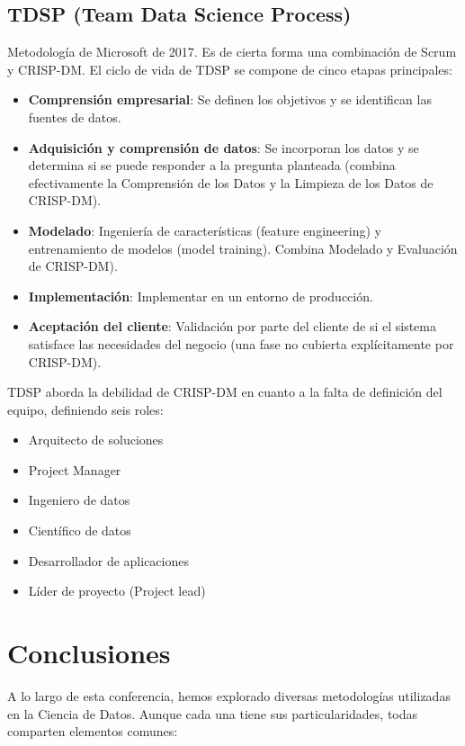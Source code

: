 \documentclass[12pt]{book}
\begin{document}
\subsection{TDSP (Team Data Science Process)}
Metodología de Microsoft de 2017. Es de cierta forma una combinación de Scrum y CRISP-DM. El ciclo de vida de TDSP se compone de cinco etapas principales:
\begin{itemize}
    \item \textbf{Comprensión empresarial}: Se definen los objetivos y se identifican las fuentes de datos.
    \item \textbf{Adquisición y comprensión de datos}: Se incorporan los datos y se determina si se puede responder a la pregunta 
    planteada (combina efectivamente la Comprensión de los Datos y la Limpieza de los Datos de CRISP-DM).
    \item \textbf{Modelado}: Ingeniería de características (feature engineering) y entrenamiento de modelos (model training). Combina Modelado y Evaluación de CRISP-DM).
    \item \textbf{Implementación}: Implementar en un entorno de producción.
    \item \textbf{Aceptación del cliente}: Validación por parte del cliente de si el sistema satisface las necesidades del negocio (una fase no cubierta explícitamente por CRISP-DM).
\end{itemize}
TDSP aborda la debilidad de CRISP-DM en cuanto a la falta de definición del equipo, definiendo seis roles:
\begin{itemize}
    \item Arquitecto de soluciones
    \item Project Manager
    \item Ingeniero de datos
    \item Científico de datos
    \item Desarrollador de aplicaciones
    \item Líder de proyecto (Project lead)
\end{itemize}

\section{Conclusiones}
\label{sec:conclusiones}

A lo largo de esta conferencia, hemos explorado diversas metodologías utilizadas en la Ciencia de Datos. Aunque cada una tiene sus particularidades, todas comparten elementos comunes:
\end{document}
